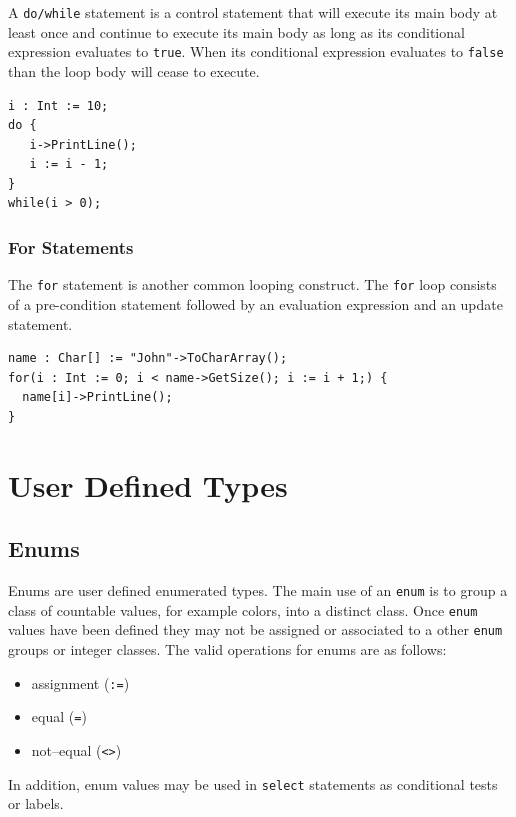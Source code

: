 \documentclass[12pt]{article}
\begin{document}
A \texttt{do/while} statement is a control statement that will execute its main body at least once and continue to execute its main body as long as its conditional expression evaluates to \texttt{true}.  When its conditional expression evaluates to \texttt{false} than the loop body will cease to execute.

\begin{verbatim}
i : Int := 10;
do { 
   i->PrintLine();
   i := i - 1;
} 
while(i > 0);
\end{verbatim}

\subsubsection{For Statements}

The \texttt{for} statement is another common looping construct.  The \texttt{for} loop consists of a pre-condition statement followed by an evaluation expression and an update statement.

\begin{verbatim}
name : Char[] := "John"->ToCharArray();
for(i : Int := 0; i < name->GetSize(); i := i + 1;) {
  name[i]->PrintLine();
}
\end{verbatim}

\section{User Defined Types}

\subsection{Enums}
Enums are user defined enumerated types.  The main use of an  \texttt{enum}  is to group a class of countable values, for example colors, into a distinct class.  Once \texttt{enum}  values have been defined they may not be assigned or associated to a other \texttt{enum}  groups or integer classes.  The valid operations for enums are as follows:

\begin{itemize}
    \item assignment (\texttt{:=})
    \item equal (\texttt{=})
    \item not--equal (\texttt{<>})
\end{itemize}

In addition, enum values may be used in \texttt{select} statements as conditional tests or labels.
\end{document}
